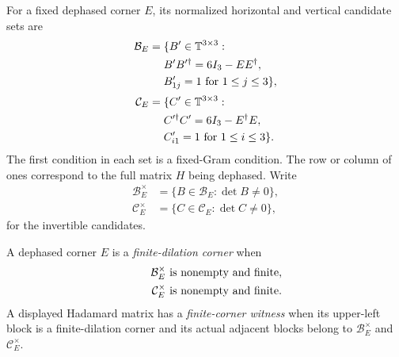 \begin{definition}
For a fixed dephased corner $E$, its normalized horizontal and vertical candidate sets are
\begin{equation}
\begin{aligned}
\mathcal B_E={}&\{B'\in\mathbb T^{3\times3}:\\
&B'B'^{\dagger}=6I_3-EE^{\dagger},\\
&B'_{1j}=1\ \text{for }1\le j\le3\},\\[2pt]
\mathcal C_E={}&\{C'\in\mathbb T^{3\times3}:\\
&C'^{\dagger}C'=6I_3-E^{\dagger}E,\\
&C'_{i1}=1\ \text{for }1\le i\le3\}.
\end{aligned}
\label{eq:candidatesets}
\end{equation}
The first condition in each set is a fixed-Gram condition. The row or column of ones correspond to the full matrix $H$ being dephased.
Write
\begin{equation}
\begin{aligned}
\mathcal B_E^\times&=\{B\in\mathcal B_E:\det B\ne0\},\\
\mathcal C_E^\times&=\{C\in\mathcal C_E:\det C\ne0\},
\end{aligned}
\label{eq:invertible-candidates}
\end{equation}
for the invertible candidates.
\end{definition}

\begin{definition}
\label{def:finitecorner}
A dephased corner $E$ is a \emph{finite-dilation corner} when
\begin{align}
\mathcal B_E^\times\text{ is nonempty and finite}, \notag \\
\qquad
\mathcal C_E^\times\text{ is nonempty and finite}.
\label{eq:finite-dilation-corner}
\end{align}
A displayed Hadamard matrix has a \emph{finite-corner witness} when its upper-left block is a finite-dilation corner and its actual adjacent blocks belong to $\mathcal B_E^\times$ and $\mathcal C_E^\times$.
\end{definition}

